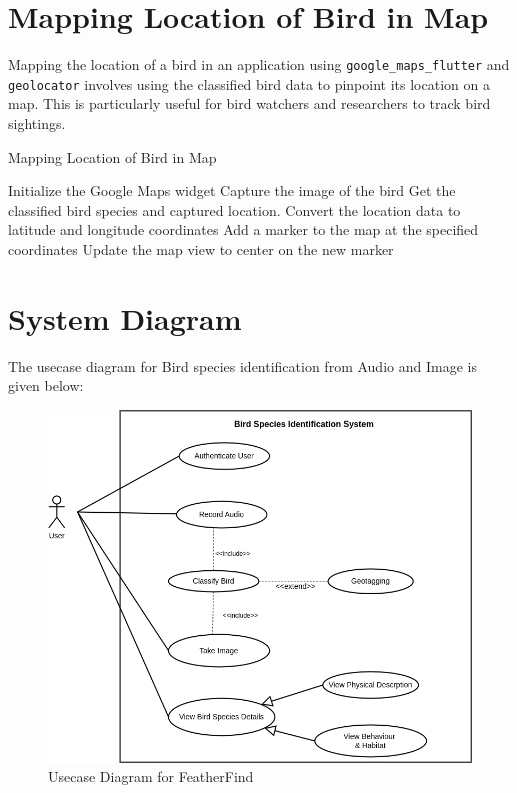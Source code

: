 \section{Mapping Location of Bird in Map}

Mapping the location of a bird in an application using
\texttt{google\_maps\_flutter} and \texttt{geolocator} involves using the classified bird data to
pinpoint its location on a map. This is particularly useful for bird watchers
and researchers to track bird sightings.

\begin{algorithm}
    \caption{Mapping Location of Bird in Map}
    \begin{algorithmic}[1]
        \STATE Initialize the Google Maps widget
        \STATE Capture the image of the bird
        \STATE Get the classified bird species and captured location.
        \STATE Convert the location data to latitude and longitude coordinates
        \STATE Add a marker to the map at the specified coordinates
        \STATE Update the map view to center on the new marker
    \end{algorithmic}
\end{algorithm}
\newpage
\section{System Diagram}
The usecase diagram for Bird species identification from Audio and Image is given
below:
\begin{figure}[h!]
     \centering
        \includegraphics[scale=0.5]{images/usecase.png}
        \caption{Usecase Diagram for FeatherFind}%
     \end{figure}


